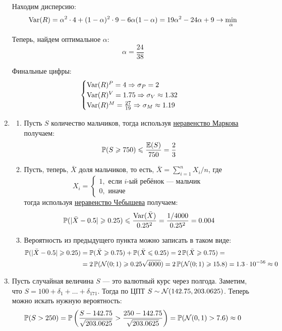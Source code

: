 \begin{enumerate}
Находим дисперсию:
\[
\operatorname{Var}(R) = \alpha^2 \cdot 4 + (1-\alpha)^2 \cdot 9 - 6\alpha (1-\alpha) = 19\alpha^2 -24\alpha + 9 \to \min_{\alpha}
\]

Теперь, найдем оптимальное $\alpha$:
\[
\alpha = \frac{24}{38}
\]

Финальные цифры:
\[
\begin{cases}
\operatorname{Var}(R)^{P} = 4 \Rightarrow \sigma_{P} = 2 \\
\operatorname{Var}(R)^{V} = 1.75 \Rightarrow \sigma_{V} \approx 1.32 \\
\operatorname{Var}(R)^{M} = \frac{27}{19} \Rightarrow \sigma_{M} \approx 1.19 \\
\end{cases}
\]
\item
\begin{enumerate}
\item Пусть $S$ количество мальчиков, тогда используя \href{https://en.wikipedia.org/wiki/Markov%27s_inequality}{неравенство Маркова} получаем:
\[
\operatorname{\mathbb{P}}(S \geqslant 750) \leqslant \frac{\operatorname{\mathbb{E}}(S)}{750} = \frac{2}{3}
\]
\item Пусть, теперь, $\bar{X}$ доля мальчиков, то есть, $\bar{X} = \sum_{i=1}^n X_i /n$, где
\[
X_i =
\begin{cases}
1, \text{ если }i\text{-ый ребёнок — мальчик }\\
0, \text{ иначе }
\end{cases}
\]
тогда используя \href{https://en.wikipedia.org/wiki/Markov%27s_inequality}{неравенство Чебышева} получаем:
\[
\operatorname{\mathbb{P}}(|\bar{X} - 0.5| \geqslant 0.25) \leqslant \frac{\operatorname{Var}(\bar{X})}{0.25^2} = \frac{1/4000}{0.25^2} = 0.004
\]
\item Вероятность из предыдущего пункта можно записать в таком виде:
\begin{align*}
\operatorname{\mathbb{P}}(|\bar{X} - 0.5| \geqslant 0.25) &= \operatorname{\mathbb{P}}(\bar{X} \geqslant 0.75) + \operatorname{\mathbb{P}}(\bar{X} \leqslant 0.25) = 2\operatorname{\mathbb{P}}(\bar{X} \geqslant 0.75)=\\
&= 2\operatorname{\mathbb{P}}(\mathcal{N}(0;1)\geqslant 0.25\sqrt{4000})=2\operatorname{\mathbb{P}}(\mathcal{N}(0;1)\geqslant 15.8) = 1.3 \cdot 10^{-56} \approx 0
\end{align*}
\end{enumerate}
\item Пусть случайная величина $S$ —  это валютный курс через полгода. Заметим, что $S = 100 + \delta_1 + \ldots + \delta_{171}$.
Тогда по ЦПТ $S \sim \mathcal{N}(142.75, 203.0625)$. Теперь можно искать нужную вероятность:
\[
\operatorname{\mathbb{P}}(S > 250) = \operatorname{\mathbb{P}} \left(\frac{S -  142.75}{\sqrt{203.0625}} > \frac{250-142.75}{\sqrt{203.0625}} \right) = \operatorname{\mathbb{P}}(\mathcal{N}(0, 1) > 7.6) \approx 0
\]
\end{enumerate}



